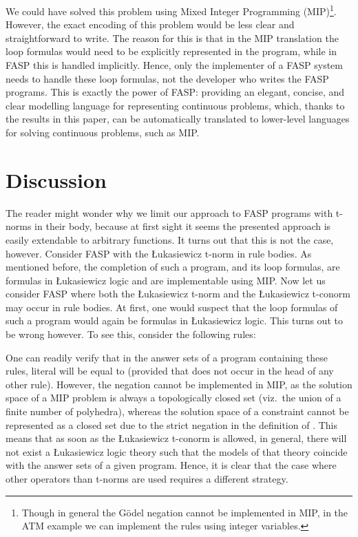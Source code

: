 \documentclass{tlp}
\begin{document}
We could have solved this problem using Mixed Integer Programming (MIP)\footnote{Though in general the G\"odel negation  cannot be implemented in MIP, in the ATM example we can implement the  rules using integer variables.}. However, the exact encoding of this problem would be less clear and straightforward to write. The reason for this is that in the MIP translation the loop formulas would need to be explicitly represented in the program, while in FASP this is handled implicitly. Hence, only the implementer of a FASP system needs to handle these loop formulas, not the developer who writes the FASP programs. This is exactly the power of FASP: providing an elegant, concise, and clear modelling language for representing continuous problems, which, thanks to the results in this paper, can be automatically translated to lower-level languages for solving continuous problems, such as MIP.



\section{Discussion}\label{sec:restrict}

The reader might wonder why we limit our approach to FASP programs with t-norms in their body, because at first sight it
seems the presented approach is easily extendable to arbitrary functions. It turns out that this is not the case,
however. Consider FASP with the \L ukasiewicz t-norm in rule bodies. As mentioned before, the completion of such a program, and its loop formulas, are formulas in \L ukasiewicz logic and are implementable using MIP. Now let us consider FASP where both the \L ukasiewicz t-norm and the \L ukasiewicz t-conorm may occur in rule bodies. At first, one would suspect that the loop formulas of such a program would again be formulas in \L ukasiewicz logic.
This turns out to be wrong however. To see this, consider the following rules:
 
One can readily verify that in the answer sets of a program containing these rules, literal  will be equal to  (provided that  does not occur in the head of any other rule). 
However, the negation  cannot be implemented in MIP, as the solution space of a MIP problem is always a topologically closed set (viz.~the union of a finite number of polyhedra), whereas the solution space of a constraint  cannot be represented as a closed set due to the strict negation in the definition of . This means that as soon as the \L ukasiewicz t-conorm is allowed, in general, there will not exist a \L ukasiewicz logic theory such that the models of that theory coincide with the answer sets of a given program. Hence, it is clear that the case where other operators than t-norms are used requires a different strategy.
\end{document}
